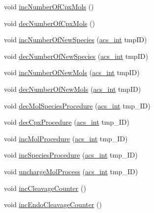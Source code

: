 \begin{DoxyCompactItemize}
\item 
void \hyperlink{classenvironment_ab101d2158575829ddfe846087040f2fa}{inc\-Number\-Of\-Cpx\-Mols} ()
\item 
void \hyperlink{classenvironment_a756dc43b6b47498ba457613749324b15}{dec\-Number\-Of\-Cpx\-Mols} ()
\item 
void \hyperlink{classenvironment_a1055886a34a9a01ec37db31c69e460e0}{inc\-Number\-Of\-New\-Species} (\hyperlink{acs__headers_8h_a8d277355641a098190360234e2ebde35}{acs\-\_\-int} tmp\-I\-D)
\item 
void \hyperlink{classenvironment_a5fa52a4f8e73a71fa41d3a1641e50535}{dec\-Number\-Of\-New\-Species} (\hyperlink{acs__headers_8h_a8d277355641a098190360234e2ebde35}{acs\-\_\-int} tmp\-I\-D)
\item 
void \hyperlink{classenvironment_a1addb84f0c8d391f97ad2347a64208bb}{inc\-Number\-Of\-New\-Mols} (\hyperlink{acs__headers_8h_a8d277355641a098190360234e2ebde35}{acs\-\_\-int} tmp\-I\-D)
\item 
void \hyperlink{classenvironment_ae9bbd78076706050ced4dd7fb99036f1}{dec\-Number\-Of\-New\-Mols} (\hyperlink{acs__headers_8h_a8d277355641a098190360234e2ebde35}{acs\-\_\-int} tmp\-I\-D)
\item 
void \hyperlink{classenvironment_a10fad450cf5ef3a1c7cf75d616105069}{dec\-Mol\-Species\-Procedure} (\hyperlink{acs__headers_8h_a8d277355641a098190360234e2ebde35}{acs\-\_\-int} tmp\-\_\-\-I\-D)
\item 
void \hyperlink{classenvironment_a16d09f818d3012f88e8e4c9a7759b6bd}{dec\-Cpx\-Procedure} (\hyperlink{acs__headers_8h_a8d277355641a098190360234e2ebde35}{acs\-\_\-int} tmp\-\_\-\-I\-D)
\item 
void \hyperlink{classenvironment_a094499a0f1bb3c2342a3b16944f5280d}{inc\-Mol\-Procedure} (\hyperlink{acs__headers_8h_a8d277355641a098190360234e2ebde35}{acs\-\_\-int} tmp\-\_\-\-I\-D)
\item 
void \hyperlink{classenvironment_a7ac85445b4710257723c581c35cc5ac8}{inc\-Species\-Procedure} (\hyperlink{acs__headers_8h_a8d277355641a098190360234e2ebde35}{acs\-\_\-int} tmp\-\_\-\-I\-D)
\item 
void \hyperlink{classenvironment_af21c066ce18c8a39740f66a995782fb9}{uncharge\-Mol\-Process} (\hyperlink{acs__headers_8h_a8d277355641a098190360234e2ebde35}{acs\-\_\-int} tmp\-\_\-\-I\-D)
\item 
void \hyperlink{classenvironment_a480887ed06f63d34e014c19ea302d3d5}{inc\-Cleavage\-Counter} ()
\item 
void \hyperlink{classenvironment_ab0fc2cd6ed209d61286b837bd5460d90}{inc\-Endo\-Cleavage\-Counter} ()

\end{DoxyCompactItemize}
